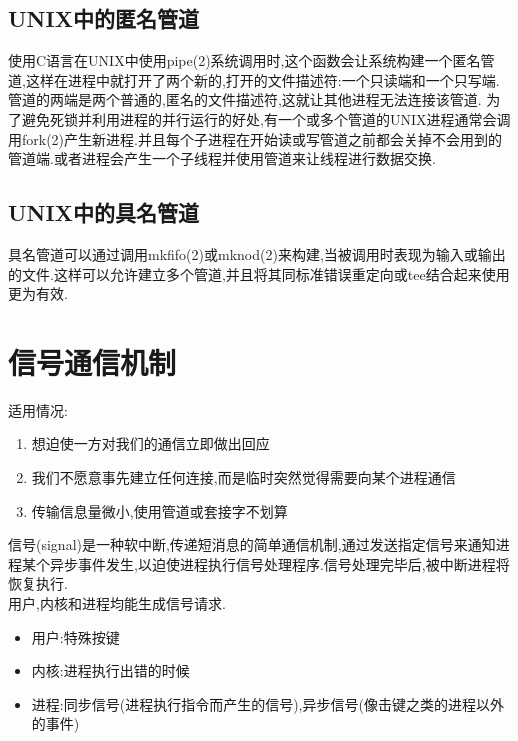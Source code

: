 \documentclass[a4paper,12pt,notitlepage]{article}
\begin{document}
\subsection{UNIX中的匿名管道}

	使用C语言在UNIX中使用pipe(2)系统调用时,这个函数会让系统构建一个匿名管道,这样在进程中就打开了两个新的,打开的文件描述符:一个只读端和一个只写端.管道的两端是两个普通的,匿名的文件描述符,这就让其他进程无法连接该管道. 为了避免死锁并利用进程的并行运行的好处,有一个或多个管道的UNIX进程通常会调用fork(2)产生新进程.并且每个子进程在开始读或写管道之前都会关掉不会用到的管道端.或者进程会产生一个子线程并使用管道来让线程进行数据交换. \\
	
\subsection{UNIX中的具名管道}

	具名管道可以通过调用mkfifo(2)或mknod(2)来构建,当被调用时表现为输入或输出的文件.这样可以允许建立多个管道,并且将其同标准错误重定向或tee结合起来使用更为有效. \\

\section{信号通信机制}

	适用情况:
	
\begin{enumerate}
	\item 想迫使一方对我们的通信立即做出回应
	\item 我们不愿意事先建立任何连接,而是临时突然觉得需要向某个进程通信
	\item 传输信息量微小,使用管道或套接字不划算
\end{enumerate}	

	信号(signal)是一种软中断,传递短消息的简单通信机制,通过发送指定信号来通知进程某个异步事件发生,以迫使进程执行信号处理程序.信号处理完毕后,被中断进程将恢复执行. \\
	
	用户,内核和进程均能生成信号请求.\\
	
\begin{itemize}
	\item 用户:特殊按键
	\item 内核:进程执行出错的时候
	\item 进程:同步信号(进程执行指令而产生的信号),异步信号(像击键之类的进程以外的事件)
\end{itemize}
	
\end{document}
